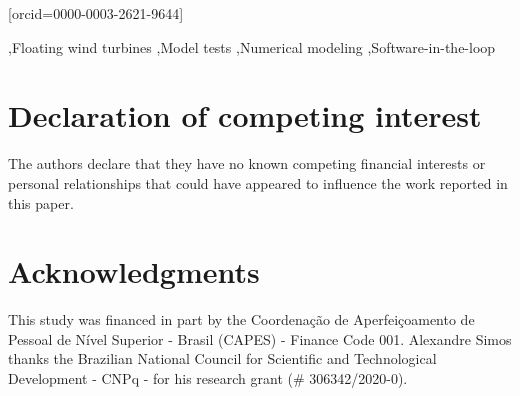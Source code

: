 \documentclass[a4paper,fleqn]{cas-sc}
\begin{document}

\author[1]{Pedro C. de Mello}[orcid=0000-0003-2621-9644]





\begin{keywords}
    \sep Floating wind turbines \sep Model tests \sep Numerical modeling \sep Software-in-the-loop
\end{keywords}
  
\maketitle

\linenumbers







\printcredits

\section*{Declaration of competing interest}
The authors declare that they have no known competing financial interests or personal relationships that could have appeared to influence the work reported in this paper.

\section*{Acknowledgments}
This study was financed in part by the Coordenação de Aperfeiçoamento de Pessoal de Nível Superior - Brasil (CAPES) - Finance Code 001. Alexandre Simos thanks the Brazilian National Council for Scientific and Technological Development - CNPq - for his research grant (\# 306342/2020-0). 

%





%
\end{document}

